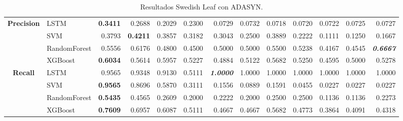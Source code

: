 \begin{table}[H]
\begin{adjustbox}{max width=12cm}
\begin{tabular}{|c|l|r|r|r|r|r|r|r|r|r|r|r|}
		\hline
		\textbf{Precision} &  LSTM & \textbf{  0.3411 } &  0.2688 &  0.2029 &  0.2300 &  0.0729 &  0.0732 &  0.0718 &  0.0720 &  0.0722 &  0.0725 &  0.0727 \\
		&  SVM &  0.3793 & \textbf{  0.4211 } &  0.3857 &  0.3182 &  0.3043 &  0.2500 &  0.3889 &  0.2222 &  0.1111 &  0.1250 &  0.1667 \\
		&  RandomForest &  0.5556 &  0.6176 &  0.4800 &  0.4500 &  0.5000 &  0.5000 &  0.5500 &  0.5238 &  0.4167 &  0.4545 & \textit{ \textbf{  0.6667 } } \\
		&  XGBoost & \textbf{  0.6034 } &  0.5614 &  0.5957 &  0.5227 &  0.4884 &  0.5122 &  0.5682 &  0.5250 &  0.4595 &  0.5000 &  0.5278 \\
		\hline
		\textbf{Recall} &  LSTM &  0.9565 &  0.9348 &  0.9130 &  0.5111 & \textit{ \textbf{  1.0000 } } &  1.0000 &  1.0000 &  1.0000 &  1.0000 &  1.0000 &  1.0000 \\
		&  SVM & \textbf{  0.9565 } &  0.8696 &  0.5870 &  0.3111 &  0.1556 &  0.0889 &  0.1591 &  0.0455 &  0.0227 &  0.0227 &  0.0227 \\
		&  RandomForest & \textbf{  0.5435 } &  0.4565 &  0.2609 &  0.2000 &  0.2222 &  0.2000 &  0.2500 &  0.2500 &  0.1136 &  0.1136 &  0.2273 \\
		&  XGBoost & \textbf{  0.7609 } &  0.6957 &  0.6087 &  0.5111 &  0.4667 &  0.4667 &  0.5682 &  0.4773 &  0.3864 &  0.4091 &  0.4318 \\
		\hline
	\end{tabular}
\end{adjustbox}
\caption{Resultados Swedish Leaf con ADASYN.}
\label{tab:SLeaf_ADASYN}
\end{table}

